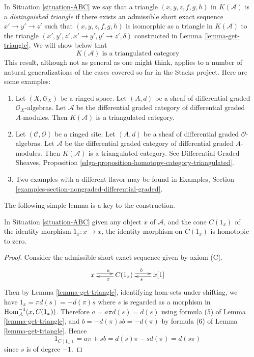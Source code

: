 \noindent
In Situation \ref{situation-ABC} we say that a triangle
$(x, y, z, f, g, h)$ in $K(\mathcal{A})$ is a
{\it distinguished triangle} if there exists an admissible
short exact sequence $x' \to y' \to z'$ such that
$(x, y, z, f, g, h)$ is isomorphic as a triangle in $K(\mathcal{A})$
to the triangle $(x', y', z', x' \to y', y' \to z', \delta)$
constructed in Lemma \ref{lemma-get-triangle}. We will show below that
$$
\boxed{
K(\mathcal{A})\text{ is a triangulated category}
}
$$
This result, although not as general as one might think, applies to a
number of natural generalizations of the cases covered so far in the
Stacks project. Here are some examples:
\begin{enumerate}
\item Let $(X, \mathcal{O}_X)$ be a ringed space. Let $(A, d)$ be a
sheaf of differential graded $\mathcal{O}_X$-algebras. Let
$\mathcal{A}$ be the differential graded category of differential
graded $A$-modules. Then $K(\mathcal{A})$ is a triangulated category.
\item Let $(\mathcal{C}, \mathcal{O})$ be a ringed site. Let $(A, d)$ be a
sheaf of differential graded $\mathcal{O}$-algebras. Let
$\mathcal{A}$ be the differential graded category of differential
graded $A$-modules. Then $K(\mathcal{A})$ is a triangulated category.
See Differential Graded Sheaves, Proposition
\ref{sdga-proposition-homotopy-category-triangulated}.
\item Two examples with a different flavor may be found in Examples, Section
\ref{examples-section-nongraded-differential-graded}.
\end{enumerate}

\noindent
The following simple lemma is a key to the construction.

\begin{lemma}
\label{lemma-id-cone-null}
In Situation \ref{situation-ABC}
given any object $x$ of $\mathcal{A}$, and the cone $C(1_x)$ of the
identity morphism $1_x : x \to x$, the identity morphism on
$C(1_x)$ is homotopic to zero.
\end{lemma}

\begin{proof}
Consider the admissible short exact sequence given by axiom (C).
$$
\xymatrix{
x \ar@<0.5ex>[r]^a  &
C(1_x) \ar@<0.5ex>[l]^{\pi} \ar@<0.5ex>[r]^b &
x[1]\ar@<0.5ex>[l]^s
}
$$
Then by Lemma \ref{lemma-get-triangle}, identifying hom-sets under
shifting, we have $1_x=\pi d(s)=-d(\pi)s$ where $s$ is regarded as
a morphism in $\mathop{\mathrm{Hom}}\nolimits_{\mathcal{A}}^{-1}(x,C(1_x))$. Therefore
$a=a\pi d(s)=d(s)$ using formula (5) of Lemma \ref{lemma-get-triangle},
and $b=-d(\pi)sb=-d(\pi)$ by formula (6) of Lemma \ref{lemma-get-triangle}.
Hence
$$
1_{C(1_x)} = a\pi + sb = d(s)\pi - sd(\pi) = d(s\pi)
$$
since $s$ is of degree $-1$.
\end{proof}

